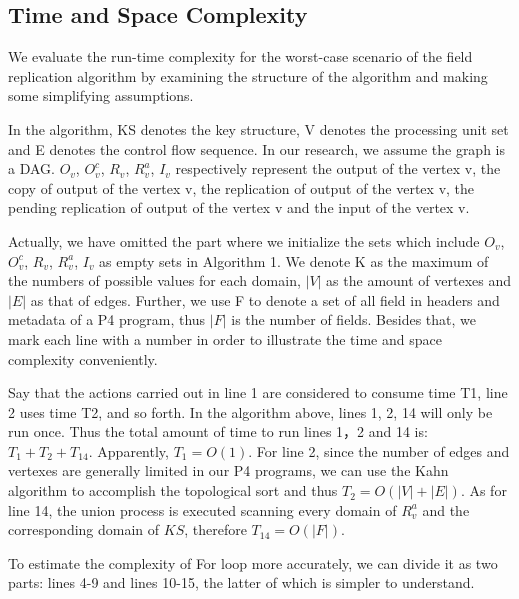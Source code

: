\documentclass[sigconf]{acmart}
\begin{document}



\subsection{Time and Space Complexity}
We evaluate the run-time complexity for the worst-case scenario of the field replication algorithm by examining the structure of the algorithm and making some simplifying assumptions.

In the algorithm, KS denotes the key structure, V denotes the processing unit set and E denotes the control flow sequence. In our research, we assume the graph is a DAG. $O_{v}$,  $O^{c}_{v}$, $R_{v}$, $R^{a}_{v}$, $I_{v}$ respectively represent the output of the vertex v, the copy of output of the vertex v, the replication of output of the vertex v, the pending replication of output of the vertex v and the input of the vertex v.

Actually, we have omitted the part where we initialize the sets which include $O_{v}$,  $O^{c}_{v}$, $R_{v}$, $R^{a}_{v}$, $I_{v}$ as empty sets in Algorithm 1. We denote K as the maximum of the numbers of possible values for each domain, $|V|$ as the amount of vertexes and $|E|$ as that of edges. Further, we use F to denote a set of all field in headers and metadata of a P4 program, thus $|F|$ is the number of fields. Besides that, we mark each line with a number in order to illustrate the time and space complexity conveniently.

Say that the actions carried out in line 1 are considered to consume time T1, line 2 uses time T2, and so forth.
In the algorithm above, lines 1, 2, 14 will only be run once. Thus the total amount of time to run lines 1，2 and 14 is:
$ T_{1}+T_{2}+T_{14}.$ Apparently, $ T_{1} = O(1)$. For line 2, since the number of edges and vertexes are generally limited in our P4 programs, we can use the Kahn algorithm to accomplish the topological sort and thus $ T_{2} = O(|V| + |E|)$. As for line 14, the union process is executed scanning every domain of $R^{a}_{v}$ and the corresponding domain of $KS$, therefore $ T_{14} = O(|F|)$.

To estimate the complexity of For loop more accurately, we can divide it as two parts: lines 4-9 and lines 10-15, the latter of which is simpler to understand.
\end{document}
